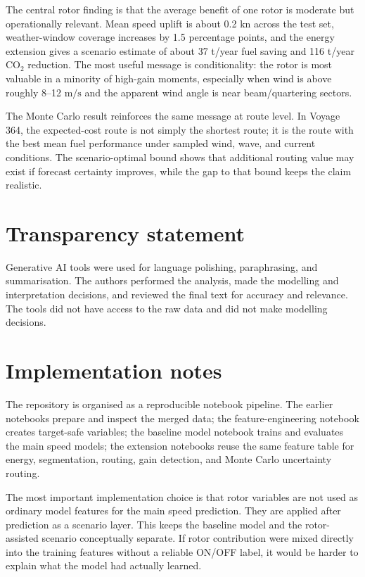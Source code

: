 \documentclass[10pt,a4paper]{article}
\newcommand{\kn}{\ensuremath{\mathrm{kn}}}
\newcommand{\ms}{\ensuremath{\mathrm{m/s}}}
\newcommand{\co}{CO$_2$}
\begin{document}
The central rotor finding is that the average benefit of one rotor is moderate
but operationally relevant. Mean speed uplift is about 0.2 \kn{} across the test
set, weather-window coverage increases by 1.5 percentage points, and the energy
extension gives a scenario estimate of about 37 t/year fuel saving and
116 t/year \co{} reduction. The most useful message is conditionality: the rotor
is most valuable in a minority of high-gain moments, especially when wind is
above roughly 8--12 \ms{} and the apparent wind angle is near beam/quartering
sectors.

The Monte Carlo result reinforces the same message at route level. In Voyage
364, the expected-cost route is not simply the shortest route; it is the route
with the best mean fuel performance under sampled wind, wave, and current
conditions. The scenario-optimal bound shows that additional routing value may
exist if forecast certainty improves, while the gap to that bound keeps the
claim realistic.


\section{Transparency statement}
\label{sec:transparency}

Generative AI tools were used for language polishing, paraphrasing, and
summarisation. The authors performed the analysis, made the modelling and
interpretation decisions, and reviewed the final text for accuracy and
relevance. The tools did not have access to the raw data and did not make
modelling decisions.

\appendix

\section{Implementation notes}
\label{app:implementation-notes}

The repository is organised as a reproducible notebook pipeline. The earlier
notebooks prepare and inspect the merged data; the feature-engineering notebook
creates target-safe variables; the baseline model notebook trains and evaluates
the main speed models; the extension notebooks reuse the same feature table for
energy, segmentation, routing, gain detection, and Monte Carlo uncertainty
routing.

The most important implementation choice is that rotor variables are not used as
ordinary model features for the main speed prediction. They are applied after
prediction as a scenario layer. This keeps the baseline model and the
rotor-assisted scenario conceptually separate. If rotor contribution were mixed
directly into the training features without a reliable ON/OFF label, it would be
harder to explain what the model had actually learned.
\end{document}
